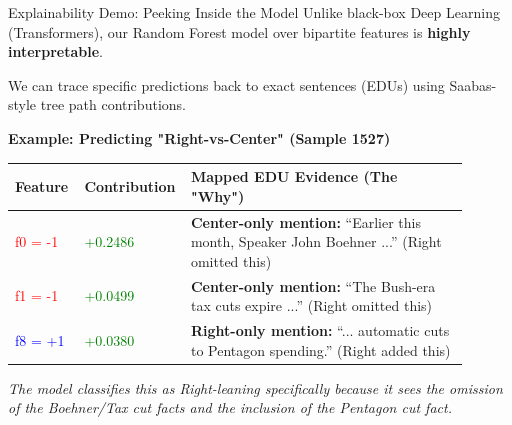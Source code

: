 \documentclass[aspectratio=169, 10pt]{beamer}
\begin{document}
\begin{frame}{Explainability Demo: Peeking Inside the Model}
    Unlike black-box Deep Learning (Transformers), our Random Forest model over bipartite features is \textbf{highly interpretable}.
    \vspace{0.2cm}
    
    We can trace specific predictions back to exact sentences (EDUs) using Saabas-style tree path contributions.
    
    \vspace{0.2cm}
    \textbf{Example: Predicting "Right-vs-Center" (Sample 1527)}
    \begin{table}[]
        \centering
        \small
        \begin{tabular}{p{0.15\linewidth}p{0.15\linewidth}p{0.6\linewidth}}
        \toprule
        \textbf{Feature} & \textbf{Contribution} & \textbf{Mapped EDU Evidence (The "Why")} \\
        \midrule
        \textcolor{red}{f0 = -1} & \textcolor{green}{+0.2486} & \textbf{Center-only mention:} ``Earlier this month, Speaker John Boehner ...'' (Right omitted this) \\
        \textcolor{red}{f1 = -1} & \textcolor{green}{+0.0499} & \textbf{Center-only mention:} ``The Bush-era tax cuts expire ...'' (Right omitted this) \\
        \textcolor{blue}{f8 = +1} & \textcolor{green}{+0.0380} & \textbf{Right-only mention:} ``... automatic cuts to Pentagon spending.'' (Right added this) \\
        \bottomrule
        \end{tabular}
    \end{table}
    
    \textit{The model classifies this as Right-leaning specifically because it sees the omission of the Boehner/Tax cut facts and the inclusion of the Pentagon cut fact.}
\end{frame}
\end{document}
